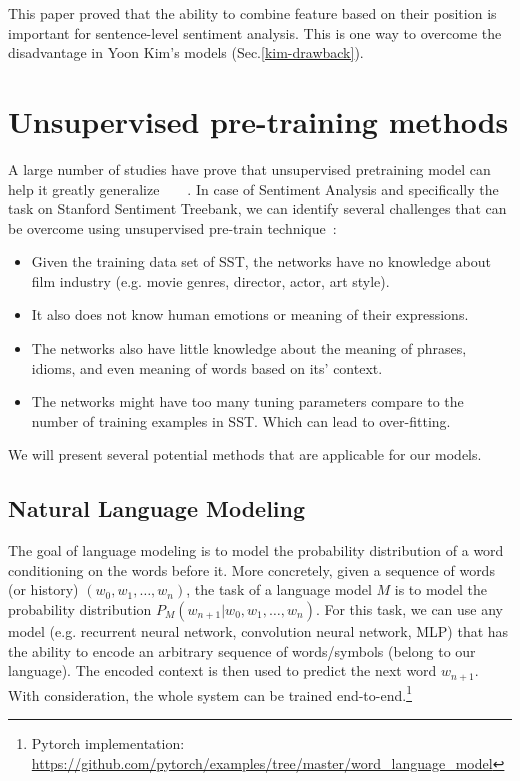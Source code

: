 This paper proved that the ability to combine feature based on their position is important for sentence-level sentiment analysis.
This is one way to overcome the disadvantage in Yoon Kim's models (Sec.\ref{kim-drawback}).


\section{Unsupervised pre-training methods}\label{sec:unsupervised-pretrain}
A large number of studies have prove that unsupervised pretraining model can help it greatly generalize~\cite{why-unsupervised}~\cite{greedy-layer}~\cite{greedy-layer-bengio}~\cite{pretrain-1}.
In case of Sentiment Analysis and specifically the task on Stanford Sentiment Treebank, we can identify several challenges that can be overcome using unsupervised pre-train technique~\cite{why-unsupervised}:
\begin{itemize}
\item Given the training data set of SST, the networks have no knowledge about film industry (e.g. movie genres, director, actor, art style).
\item It also does not know human emotions or meaning of their expressions.
\item The networks also have little knowledge about the meaning of phrases, idioms, and even meaning of words based on its' context.
\item The networks might have too many tuning parameters compare to the number of training examples in SST.
Which can lead to over-fitting.
\end{itemize}
We will present several potential methods that are applicable for our models.

\subsection{Natural Language Modeling}\label{sec:nlm}
The goal of language modeling is to model the probability distribution of a word conditioning on the words before it.
More concretely, given a sequence of words (or history) \((w_0, w_1,\ldots,w_n)\), the task of a language model \(M\) is to model the probability distribution \(P_M(w_{n+1}|w_0, w_1,\ldots,w_n)\).
For this task, we can use any model (e.g. recurrent neural network, convolution neural network, MLP) that has the ability to encode an arbitrary sequence of words/symbols (belong to our language).
The encoded context is then used to predict the next word \(w_{n+1}\).
With consideration, the whole system can be trained end-to-end.\footnote{Pytorch implementation: \url{https://github.com/pytorch/examples/tree/master/word\_language\_model}}

